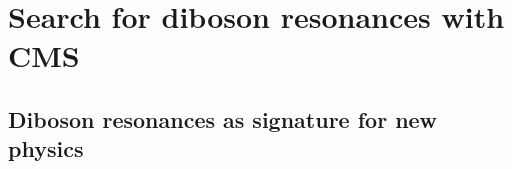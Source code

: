 \documentclass[a4paper, 11pt, twoside, openany]{ThesisStyle}
\begin{document}
\begin{titlepage}

\end{titlepage}

\tableofcontents

\newpage
{}


	

	
		
	

\part{Search for diboson resonances with CMS}

\chapter{Diboson resonances as signature for new physics}

	
	
	

			
\end{document}
